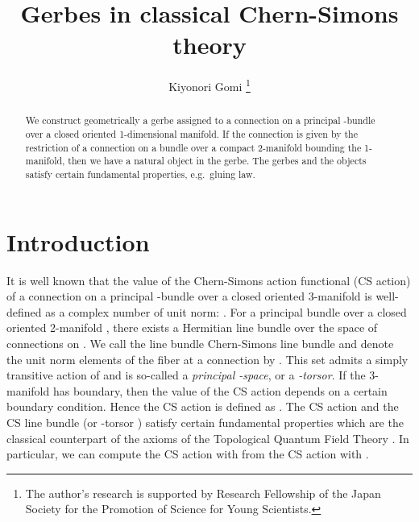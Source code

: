 \documentclass[a4paper,a4paper]{article}
\title{Gerbes in classical Chern-Simons theory}
\author{Kiyonori Gomi
\thanks{The author's research is supported by Research Fellowship of the Japan Society for the Promotion of Science for Young Scientists.}}
\date{}
\theoremstyle{definition}
\theoremstyle{remark}
\providecommand{\T}{\mathbb{T}}
\begin{document}
\maketitle

\begin{abstract}
We construct geometrically a gerbe assigned to a connection on a principal \coordHE{}-bundle over a closed oriented 1-dimensional manifold. If the connection is given by the restriction of a connection on a bundle over a compact 2-manifold bounding the 1-manifold, then we have a natural object in the gerbe. The gerbes and the objects satisfy certain fundamental properties, e.g.\ gluing law. 
\end{abstract}


\section{Introduction}
It is well known that the value of the Chern-Simons action functional (CS action) \cite{F1, R-S-W, W} of a connection \coordHE{} on a principal \coordHE{}-bundle \coordHE{} over a closed oriented 3-manifold \coordHE{} is well-defined as a complex number of unit norm: \myHighlight{$e^{2\pi\sqrt{-1} S_M(A)} \in \T$}\coordHE{}. For a principal bundle \coordHE{} over a closed oriented 2-manifold \myHighlight{$\Sigma$}\coordHE{}, there exists a Hermitian line bundle over the space of connections on \coordHE{}. We call the line bundle Chern-Simons line bundle and denote the unit norm elements of the fiber at a connection \coordHE{} by \coordHE{}. This set admits a simply transitive action of \myHighlight{$\T$}\coordHE{} and is so-called a \textit{principal \myHighlight{$\T$}\coordHE{}-space}, or a \textit{\myHighlight{$\T$}\coordHE{}-torsor}. If the 3-manifold \coordHE{} has boundary, then the value of the CS action depends on a certain boundary condition. Hence the CS action is defined as \coordHE{}. The CS action and the CS line bundle (or \myHighlight{$\T$}\coordHE{}-torsor \coordHE{}) satisfy certain fundamental properties \cite{F1, F2} which are the classical counterpart of the axioms of the Topological Quantum Field Theory \cite{A}. In particular, we can compute the CS action with \coordHE{} from the CS action with \coordHE{}.
\end{document}

